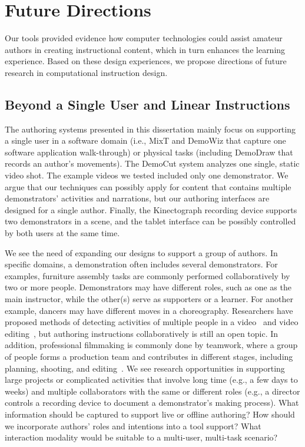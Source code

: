 \section{Future Directions} %

Our tools provided evidence how computer technologies could assist amateur authors in creating instructional content, which in turn enhances the learning experience. Based on these design experiences, we propose directions of future research in computational instruction design.

\subsection{Beyond a Single User and Linear Instructions}
The authoring systems presented in this dissertation mainly focus on supporting a single user in a software domain (i.e., MixT and DemoWiz that capture one software application walk-through) or physical tasks (including DemoDraw that records an author's movements).
%
The DemoCut system analyzes one single, static video shot. The example videos we tested included only one demonstrator. We argue that our techniques can possibly apply for content that contains multiple demonstrators' activities and narrations, but our authoring interfaces are designed for a single author.
%
Finally, the Kinectograph recording device supports two demonstrators in a scene, and the tablet interface can be possibly controlled by both users at the same time.

We see the need of expanding our designs to support a group of authors. In specific domains, a demonstration often includes several demonstrators. For examples, furniture assembly tasks are commonly performed collaboratively by two or more people. Demonstrators may have different roles, such as one as the main instructor, while the other(s) serve as supporters or a learner. For another example, dancers may have different moves in a choreography.
%
Researchers have proposed methods of detecting activities of multiple people in a video~ and video editing~\cite{PatelUIST16}, but authoring instructions collaboratively is still an open topic.
%
In addition, professional filmmaking is commonly done by teamwork, where a group of people forms a production team and contributes in different stages, including planning, shooting, and editing~. We see research opportunities in supporting large projects or complicated activities that involve long time (e.g., a few days to weeks) and multiple collaborators with the same or different roles (e.g., a director controls a recording device to document a demonstrator's making process).
What information should be captured to support live or offline authoring? How should we incorporate authors' roles and intentions into a tool support? What interaction modality would be suitable to a multi-user, multi-task scenario?


